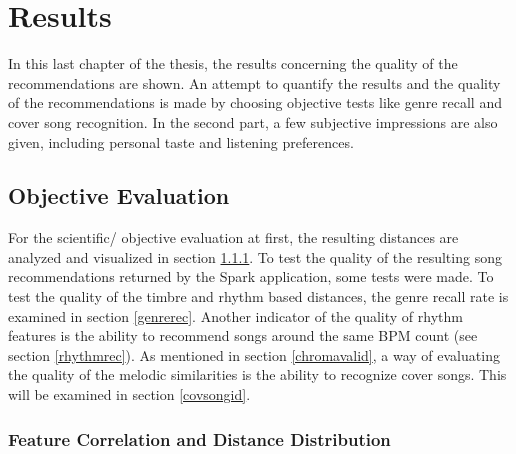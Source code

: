 
\chapter{Results}\label{bds2}

In this last chapter of the thesis, the results concerning the quality of the recommendations are shown. 
An attempt to quantify the results and the quality of the recommendations is made by choosing objective tests like genre recall and cover song recognition. In the second part, a few subjective impressions are also given, including personal taste and listening preferences. 

\section{Objective Evaluation}

For the scientific/ objective evaluation at first, the resulting distances are analyzed and visualized in section \ref{featqual}.
To test the quality of the resulting song recommendations returned by the Spark application, some tests were made. To test the quality of the timbre and rhythm based distances, the genre recall rate is examined in section \ref{genrerec}. Another indicator of the quality of rhythm features is the ability to recommend songs around the same BPM count (see section \ref{rhythmrec}). 
As mentioned in section \ref{chromavalid}, a way of evaluating the quality of the melodic similarities is the ability to recognize cover songs. This will be examined in section \ref{covsongid}. 

\subsection{Feature Correlation and Distance Distribution}\label{featqual}

